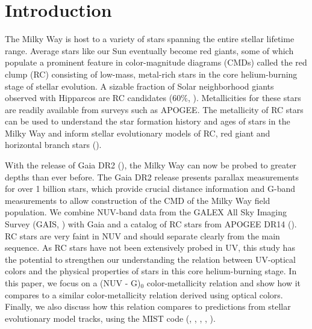 \documentclass[twocolumn]{emulateapj}
\begin{document}

\section{Introduction}
The Milky Way is host to a variety of stars spanning the entire stellar lifetime range. Average stars like our Sun eventually become red giants, some of which populate a prominent feature in color-magnitude diagrams (CMDs) called the red clump (RC) consisting of low-mass, metal-rich stars in the core helium-burning stage of stellar evolution. A sizable fraction of Solar neighborhood giants observed with Hipparcos are RC candidates (60$\%$, \citealt{girardi16}). Metallicities for these stars are readily available from surveys such as APOGEE. The metallicity of RC stars can be used to understand the star formation history and ages of stars in the Milky Way and inform stellar evolutionary models of RC, red giant and horizontal branch stars (\citealt{girardi16}).

With the release of Gaia DR2 (\citealt{gaia}), the Milky Way can now be probed to greater depths than ever before. The Gaia DR2 release presents parallax measurements for over 1 billion stars, which provide crucial distance information and G-band measurements to allow construction of the CMD of the Milky Way field population. We combine NUV-band data from the GALEX All Sky Imaging Survey (GAIS, \citealt{galex}) with Gaia and a catalog of RC stars from APOGEE DR14 (\citealt{ting18}). RC stars are very faint in NUV and should separate clearly from the main sequence. As RC stars have not been extensively probed in UV, this study has the potential to strengthen our understanding the relation between UV-optical colors and the physical properties of stars in this core helium-burning stage. In this paper, we focus on a (NUV - G)$_0$ color-metallicity relation and show how it compares to a similar color-metallicity relation derived using optical colors. Finally, we also discuss how this relation compares to predictions from stellar evolutionary model tracks, using the MIST code (\citealt{mist}, \citealt{choi16}, \citealt{paxton11}, \citealt{paxton13}, \citealt{paxton15}).
\end{document}

